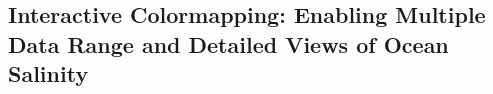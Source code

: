 \documentclass[11pt,a4paper,sans]{moderncv} %
\begin{document}
\subsection{Interactive Colormapping: Enabling Multiple Data Range and Detailed Views of Ocean Salinity}
\end{document}
